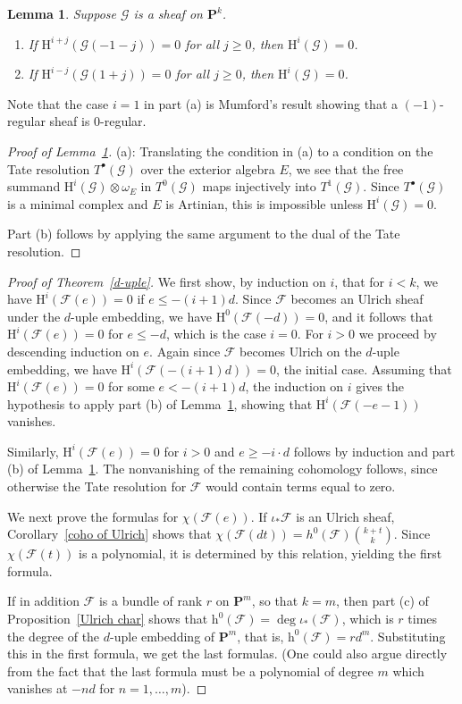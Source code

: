 \documentclass{jams-l}
\newtheorem{lemma}[theorem]{Lemma}
\theoremstyle{definition}
\theoremstyle{remark}
\newcommand{\F}{{\mathcal F}}
\newcommand{\G}{{\mathcal G}}
\newcommand{\Hrm}{{\mathrm H}}
\newcommand{\PP}{{\mathbf P}}
\newcommand{\h}{{\mathrm h}}
\begin{document}
\begin{lemma}\label{generalized Mumford} Suppose $\G$ is a sheaf on $\PP^k$.
\begin{enumerate}
\item[(a)] If \/ $\Hrm^{i+j}(\G(-1-j))=0$ for all $j\geq 0$, then $\Hrm^i(\G)=0$.
\item[(b)] If \/ $\Hrm^{i-j}(\G(1+j))=0$ for all $j\geq 0$, then $\Hrm^i(\G)=0$.
\end{enumerate}
\end{lemma}

Note that the case $i=1$ in part (a)
is Mumford's result showing that a
$(-1)$-\linebreak regular sheaf is 0-regular. 

\begin{proof}[Proof of Lemma~\ref{generalized Mumford}] (a): 
Translating the condition in (a) to a condition on the Tate
resolution $T^{\bullet}(\G)$
over the exterior algebra $E$, we see that the free summand
$\Hrm^i(\G)\otimes \omega_E$ in $T^0(\G)$ maps injectively into
$T^1(\G)$. Since $T^{\bullet}(\G)$ is a minimal complex
and $E$ is Artinian, this is impossible unless $\Hrm^i(\G)=0.$

Part (b) follows by applying the same argument to the dual of
the Tate resolution.
\end{proof}

\begin{proof}[Proof of Theorem~\ref{d-uple}]
We first show, by induction on $i$, 
that for $i<k$, we have $\Hrm^i(\F(e))=0$
if $e\leq -(i+1)d$. Since $\F$ becomes an Ulrich sheaf
under the $d$-uple embedding,
we have $\Hrm^0(\F(-d))=0$, and it follows that 
$\Hrm^i(\F(e))=0$ for $e\leq -d$, which is the case $i=0$.
For $i>0$ we proceed by descending induction on $e$. Again
since $\F$ becomes Ulrich on the $d$-uple embedding, we have
$\Hrm^i(\F(-(i+1)d))=0$, the initial case.
Assuming that 
$\Hrm^i(\F(e))=0$ for some $e<-(i+1)d$,
the induction on $i$ gives
the hypothesis to apply part (b) of
Lemma~\ref{generalized Mumford}, showing
that $\Hrm^i(\F(-e-1))$ vanishes.

Similarly, 
$\Hrm^i(\F(e))=0$
for $i>0$ and $e\geq -i\cdot d$ follows by induction and part (b) 
of Lemma~\ref{generalized Mumford}. The nonvanishing of the remaining
cohomology follows, since otherwise the Tate resolution for $\F$
would contain terms equal to zero. 

We next prove the formulas for $\chi(\F(e))$.
If $\iota_*\F$ is an Ulrich sheaf,
Corollary~\ref{coho of Ulrich}
shows that
$\chi(\F(dt))=h^0(\F){k+t\choose k}$. Since
$\chi(\F(t))$ is a polynomial, it is determined by
this relation, yielding the first formula.

If in addition $\F$ is a bundle of rank $r$ on $\PP^m$,
so that $k=m$,
then part (c) of Proposition~\ref{Ulrich char}
shows that $\h^0(\F)=\deg\iota_*(\F)$,
which is $r$ times the degree of the $d$-uple embedding of
$\PP^m$, that is, $\h^0(\F)=rd^m$. Substituting this in the
first formula, we get the last formulas. (One could also
argue directly from the fact that the last formula must be
a polynomial of degree $m$ which vanishes at $-nd$ for
$n=1,\dots,m$).
\end{proof}
\end{document}
